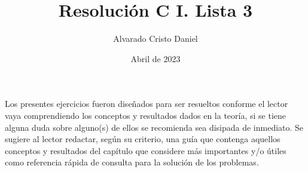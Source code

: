 \documentclass[12pt]{article}
\begin{document}
\title{Resolución C I. Lista 3}
\author{Alvarado Cristo Daniel}
\date{Abril de 2023}
\maketitle

Los presentes ejercicios fueron diseñados para ser resueltos conforme el lector vaya comprendiendo los conceptos y resultados dados en la teoría, si se tiene alguna duda sobre alguno(s) de ellos se recomienda sea disipada de inmediato. Se sugiere al lector redactar, según su criterio, una guía que contenga aquellos conceptos y resultados del capítulo que considere más importantes y/o útiles como referencia
rápida de consulta para la solución de los problemas.


\def\proof{\paragraph{Demostración:\\}}
\def\endproof{\hfill$\blacksquare$}

\def\sol{\paragraph{Solución:\\}}
\def\endsol{\hfill$\square$}

\renewcommand{\labelenumi}{\textbf{3.\theenumi.}}
\renewcommand{\labelenumii}{\textbf{\Roman{enumii}.}}
\providecommand{\abs}[1]{\left| #1 \right|}
\newcommand{\cf}[3]{\ensuremath{#1:#2\rightarrow#3}}
\end{document}
